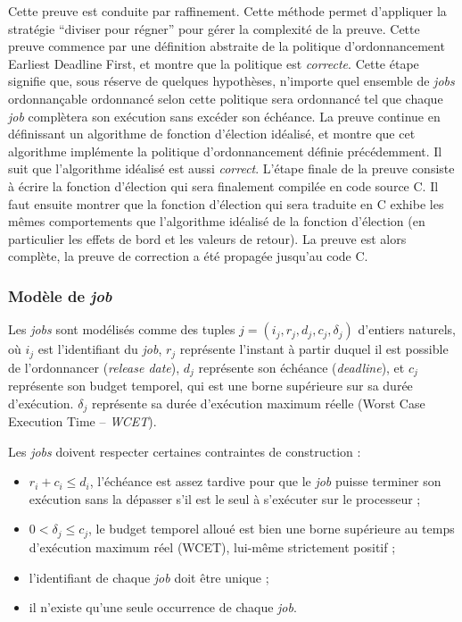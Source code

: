 	Cette preuve est conduite par raffinement. Cette méthode permet d'appliquer la stratégie ``diviser pour régner'' pour gérer la complexité de la preuve.
	Cette preuve commence par une définition abstraite de la politique d'ordonnancement Earliest Deadline First, et montre que la politique est \emph{correcte}. Cette étape signifie que, sous réserve de quelques hypothèses, n'importe quel ensemble de \emph{jobs} ordonnançable ordonnancé selon cette politique sera ordonnancé tel que chaque \emph{job} complètera son exécution sans excéder son échéance.
	La preuve continue en définissant un algorithme de fonction d'élection idéalisé, et montre que cet algorithme implémente la politique d'ordonnancement définie précédemment. Il suit que l'algorithme idéalisé est aussi \emph{correct}.
	L'étape finale de la preuve consiste à écrire la fonction d'élection qui sera finalement compilée en code source C. Il faut ensuite montrer que la fonction d'élection qui sera traduite en C exhibe les mêmes comportements que l'algorithme idéalisé de la fonction d'élection (en particulier les effets de bord et les valeurs de retour). La preuve est alors complète, la preuve de correction a été propagée jusqu'au code C.

	\subsubsection{Modèle de \emph{job}}
	\label{sec:jobmodel}
	Les \emph{jobs} sont modélisés comme des tuples $j = (i_j, r_j,d_j,c_j, \delta_j)$ d'entiers naturels, où $i_j$ est l'identifiant du \emph{job}, $r_j$ représente l'instant à partir duquel il est possible de l'ordonnancer (\emph{release date}), $d_j$ représente son échéance (\emph{deadline}), et $c_j$ représente son budget temporel, qui est une borne supérieure sur sa durée d'exécution. $\delta_j$ représente sa durée d'exécution maximum réelle (Worst Case Execution Time -- \emph{WCET}).

	Les \emph{jobs} doivent respecter certaines contraintes de construction :
	\begin{itemize}
		\item $r_i + c_i \leq d_i$, l'échéance est assez tardive pour que le \emph{job} puisse terminer son exécution sans la dépasser s'il est le seul à s'exécuter sur le processeur ;
		\item $0 < \delta_j \leq c_j$, le budget temporel alloué est bien une borne supérieure au temps d'exécution maximum réel (WCET), lui-même strictement positif ;
		\item l'identifiant de chaque \emph{job} doit être unique ;
		\item il n'existe qu'une seule occurrence de chaque \emph{job}.
	\end{itemize}

